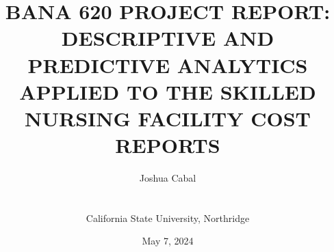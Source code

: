 \documentclass[a4paper,10pt]{article}
\begin{document}
%
   \title{\textbf{BANA 620 PROJECT REPORT: DESCRIPTIVE AND PREDICTIVE ANALYTICS APPLIED TO THE SKILLED NURSING FACILITY COST REPORTS}}

   \author{Joshua Cabal \\ \\ \\California State University, Northridge \\}
          
   \date{May 7, 2024}

   \maketitle
   
    \pagebreak
   
   \tableofcontents
 
  \newpage
    

\end{document}
